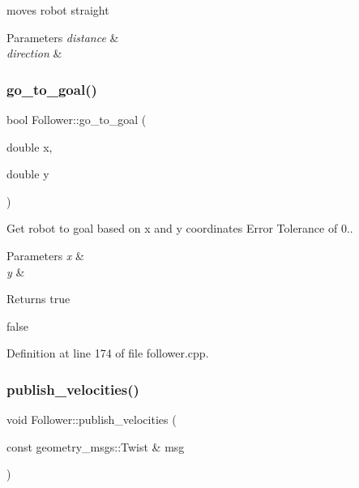 moves robot straight 


\begin{DoxyParams}{Parameters}
{\em distance} & \\
\hline
{\em direction} & \\
\hline
\end{DoxyParams}
\mbox{\label{class_follower_a08ab05cb32f0e6653939163dd22f344a}} 
\subsubsection{\texorpdfstring{go\+\_\+to\+\_\+goal()}{go\_to\_goal()}}
{\footnotesize\ttfamily bool Follower\+::go\+\_\+to\+\_\+goal (\begin{DoxyParamCaption}\item[{double}]{x,  }\item[{double}]{y }\end{DoxyParamCaption})}



Get robot to goal based on x and y coordinates Error Tolerance of 0.. 


\begin{DoxyParams}{Parameters}
{\em x} & \\
\hline
{\em y} & \\
\hline
\end{DoxyParams}
\begin{DoxyReturn}{Returns}
true 

false 
\end{DoxyReturn}


Definition at line 174 of file follower.\+cpp.

\mbox{\label{class_follower_aaae1600959a929c269d557d9c09ba777}} 
\subsubsection{\texorpdfstring{publish\+\_\+velocities()}{publish\_velocities()}}
{\footnotesize\ttfamily void Follower\+::publish\+\_\+velocities (\begin{DoxyParamCaption}\item[{const geometry\+\_\+msgs\+::\+Twist \&}]{msg }\end{DoxyParamCaption})}



